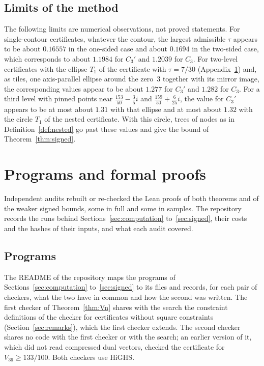 \documentclass[11pt]{amsart}
\theoremstyle{definition}
\theoremstyle{remark}
\numberwithin{equation}{section}
\newcommand{\PinPoint}{\tfrac{153}{50}-\tfrac35i}
\newcommand{\PinPointTwo}{\tfrac{159}{50}+\tfrac{6}{25}i}
\newcommand{\CapTwoP}{1.277}
\newcommand{\CapTwo}{1.282}
\newcommand{\CapThree}{1.31}
\newcommand{\CapThreeCirc}{1.32}
\begin{document}
\subsection*{Limits of the method}
The following limits are numerical observations, not proved statements. For single-contour certificates, whatever the contour, the largest admissible $\tau$ appears to be about $0.16557$ in the one-sided case and about $0.1694$ in the two-sided case, which corresponds to about $1.1984$ for $C_3'$ and $1.2039$ for $C_3$. For two-level certificates with the ellipse $T_1$ of the certificate with $\tau=7/30$ (Appendix~\ref{app:files}) and, as tiles, one axis-parallel ellipse around the zero~$3$ together with its mirror image, the corresponding values appear to be about $\CapTwoP$ for $C_3'$ and $\CapTwo$ for $C_3$. For a third level with pinned points near $\PinPoint$ and $\PinPointTwo$, the value for $C_3'$ appears to be at most about $\CapThree$ with that ellipse and at most about $\CapThreeCirc$ with the circle $T_1$ of the nested certificate. With this circle, trees of nodes as in Definition~\ref{def:nested} go past these values and give the bound of Theorem~\ref{thm:signed}.

\appendix
\section{Programs and formal proofs}\label{app:files}

Independent audits rebuilt or re-checked the Lean proofs of both theorems and of the weaker signed bounds, some in full and some in samples. The repository records the runs behind Sections~\ref{sec:computation} to~\ref{sec:signed}, their costs and the hashes of their inputs, and what each audit covered.

\subsection*{Programs} The README of the repository maps the programs of Sections~\ref{sec:computation} to~\ref{sec:signed} to its files and records, for each pair of checkers, what the two have in common and how the second was written. The first checker of Theorem~\ref{thm:Vn} shares with the search the constraint definitions of the checker for certificates without square constraints (Section~\ref{sec:remarks}), which the first checker extends. The second checker shares no code with the first checker or with the search; an earlier version of it, which did not read compressed dual vectors, checked the certificate for $V_{36}\ge133/100$. Both checkers use HiGHS.
\end{document}
